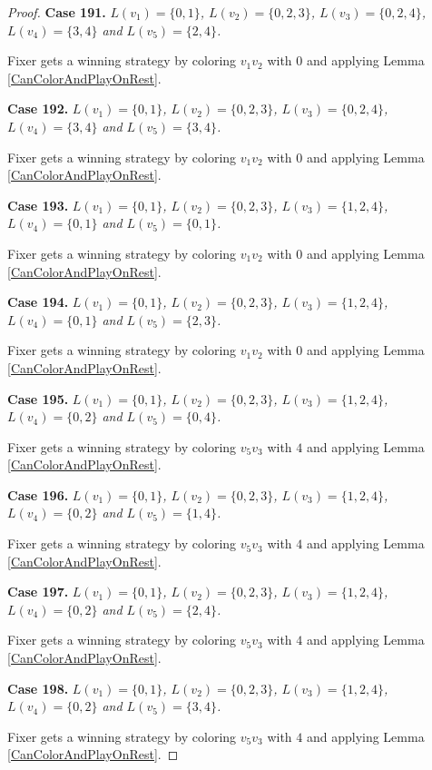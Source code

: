 \documentclass[12pt]{amsart}
\theoremstyle{plain}
\theoremstyle{definition}
\theoremstyle{remark}
\begin{document}
\begin{proof}
\noindent\textbf{Case 191.  }\textit{$L(v_1) = \{0, 1\}$, $L(v_2) = \{0, 2, 3\}$, $L(v_3) = \{0, 2, 4\}$, $L(v_4) = \{3, 4\}$ and $L(v_5) = \{2, 4\}$.}

Fixer gets a winning strategy by coloring $v_1v_2$ with $0$ and applying Lemma \ref{CanColorAndPlayOnRest}.

\noindent\textbf{Case 192.  }\textit{$L(v_1) = \{0, 1\}$, $L(v_2) = \{0, 2, 3\}$, $L(v_3) = \{0, 2, 4\}$, $L(v_4) = \{3, 4\}$ and $L(v_5) = \{3, 4\}$.}

Fixer gets a winning strategy by coloring $v_1v_2$ with $0$ and applying Lemma \ref{CanColorAndPlayOnRest}.

\noindent\textbf{Case 193.  }\textit{$L(v_1) = \{0, 1\}$, $L(v_2) = \{0, 2, 3\}$, $L(v_3) = \{1, 2, 4\}$, $L(v_4) = \{0, 1\}$ and $L(v_5) = \{0, 1\}$.}

Fixer gets a winning strategy by coloring $v_1v_2$ with $0$ and applying Lemma \ref{CanColorAndPlayOnRest}.

\noindent\textbf{Case 194.  }\textit{$L(v_1) = \{0, 1\}$, $L(v_2) = \{0, 2, 3\}$, $L(v_3) = \{1, 2, 4\}$, $L(v_4) = \{0, 1\}$ and $L(v_5) = \{2, 3\}$.}

Fixer gets a winning strategy by coloring $v_1v_2$ with $0$ and applying Lemma \ref{CanColorAndPlayOnRest}.

\noindent\textbf{Case 195.  }\textit{$L(v_1) = \{0, 1\}$, $L(v_2) = \{0, 2, 3\}$, $L(v_3) = \{1, 2, 4\}$, $L(v_4) = \{0, 2\}$ and $L(v_5) = \{0, 4\}$.}

Fixer gets a winning strategy by coloring $v_5v_3$ with $4$ and applying Lemma \ref{CanColorAndPlayOnRest}.

\noindent\textbf{Case 196.  }\textit{$L(v_1) = \{0, 1\}$, $L(v_2) = \{0, 2, 3\}$, $L(v_3) = \{1, 2, 4\}$, $L(v_4) = \{0, 2\}$ and $L(v_5) = \{1, 4\}$.}

Fixer gets a winning strategy by coloring $v_5v_3$ with $4$ and applying Lemma \ref{CanColorAndPlayOnRest}.

\noindent\textbf{Case 197.  }\textit{$L(v_1) = \{0, 1\}$, $L(v_2) = \{0, 2, 3\}$, $L(v_3) = \{1, 2, 4\}$, $L(v_4) = \{0, 2\}$ and $L(v_5) = \{2, 4\}$.}

Fixer gets a winning strategy by coloring $v_5v_3$ with $4$ and applying Lemma \ref{CanColorAndPlayOnRest}.

\noindent\textbf{Case 198.  }\textit{$L(v_1) = \{0, 1\}$, $L(v_2) = \{0, 2, 3\}$, $L(v_3) = \{1, 2, 4\}$, $L(v_4) = \{0, 2\}$ and $L(v_5) = \{3, 4\}$.}

Fixer gets a winning strategy by coloring $v_5v_3$ with $4$ and applying Lemma \ref{CanColorAndPlayOnRest}.


\end{proof}
\end{document}
